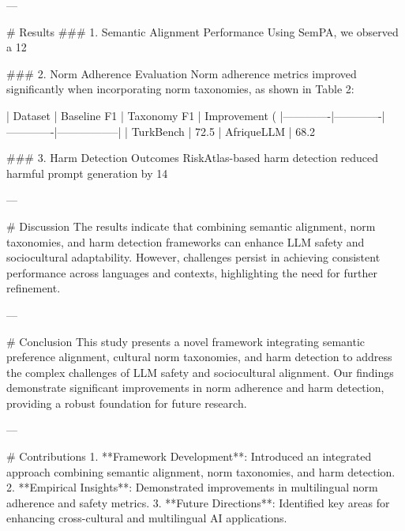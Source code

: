 ---

# Results  
### 1. Semantic Alignment Performance  
Using SemPA, we observed a 12%

### 2. Norm Adherence Evaluation  
Norm adherence metrics improved significantly when incorporating norm taxonomies, as shown in Table 2:  

| Dataset     | Baseline F1 | Taxonomy F1 | Improvement (%
|-------------|-------------|-------------|-----------------|  
| TurkBench   | 72.5%
| AfriqueLLM  | 68.2%

### 3. Harm Detection Outcomes  
RiskAtlas-based harm detection reduced harmful prompt generation by 14%

---

# Discussion  
The results indicate that combining semantic alignment, norm taxonomies, and harm detection frameworks can enhance LLM safety and sociocultural adaptability. However, challenges persist in achieving consistent performance across languages and contexts, highlighting the need for further refinement.

---

# Conclusion  
This study presents a novel framework integrating semantic preference alignment, cultural norm taxonomies, and harm detection to address the complex challenges of LLM safety and sociocultural alignment. Our findings demonstrate significant improvements in norm adherence and harm detection, providing a robust foundation for future research.

---

# Contributions  
1. **Framework Development**: Introduced an integrated approach combining semantic alignment, norm taxonomies, and harm detection.  
2. **Empirical Insights**: Demonstrated improvements in multilingual norm adherence and safety metrics.  
3. **Future Directions**: Identified key areas for enhancing cross-cultural and multilingual AI applications.

